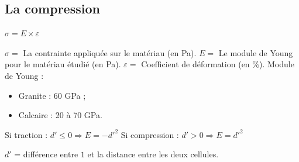 \documentclass{beamer}
\begin{document}
\subsection{La compression}
\begin{frame}
  \begin{center}
    $\sigma = E \times \varepsilon$
  \end{center}
  $\sigma = $ La contrainte appliquée sur le matériau (en Pa). $E = $ Le module de Young pour le matériau étudié (en Pa). $\varepsilon = $ Coefficient de déformation (en $\%$). \smallbreak
  Module de Young :
  \begin{itemize}
    \item Granite : 60 GPa ;
    \item Calcaire : 20 à 70 GPa.
  \end{itemize}
  \smallbreak
  \begin{center}
    Si traction : $d' \leqslant 0 \Rightarrow E = -d'^2$ \medbreak
    Si compression : $d' > 0 \Rightarrow E = d'^2$
  \end{center}
  $d'$ = différence entre $1$ et la distance entre les deux cellules. \\
\end{frame}
\end{document}
